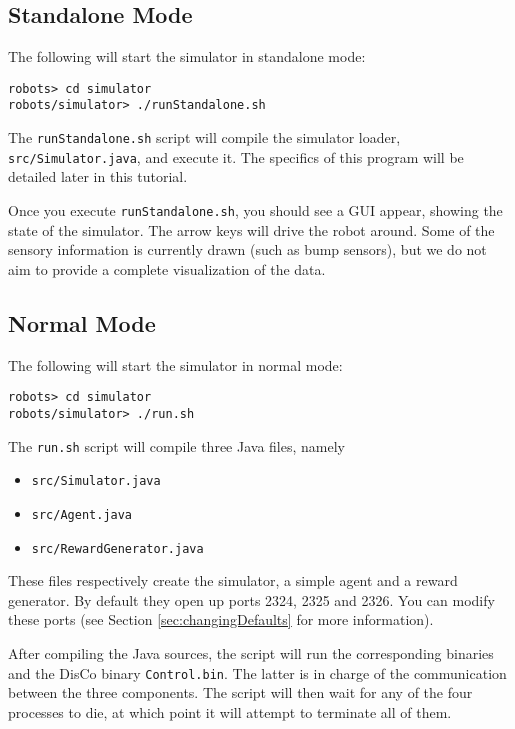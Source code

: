 \documentclass[12pt]{article}
\begin{document}
\subsection{Standalone Mode}\label{subsec:standalone}

The following will start the simulator in standalone mode:

\begin{verbatim}
robots> cd simulator 
robots/simulator> ./runStandalone.sh
\end{verbatim}

The \verb+runStandalone.sh+ script will compile the simulator loader,
\verb+src/Simulator.java+, and execute it. The specifics of this program will 
be detailed later in this tutorial.

Once you execute \verb+runStandalone.sh+, you should see a GUI appear, showing
the state of the simulator. The arrow keys will drive the robot around. Some 
of the
sensory information is currently drawn (such as bump sensors), but we do not
aim to provide a complete visualization of the data.

\subsection{Normal Mode}

The following will start the simulator in normal mode:

\begin{verbatim}
robots> cd simulator 
robots/simulator> ./run.sh
\end{verbatim}

The \verb+run.sh+ script will compile three Java files, namely

\begin{itemize}
\item{\verb+src/Simulator.java+}
\item{\verb+src/Agent.java+}
\item{\verb+src/RewardGenerator.java+}
\end{itemize}

These files respectively create the simulator, a simple agent and a reward
generator. By default they open up ports 2324, 2325 and 2326. You can modify
these ports (see Section \ref{sec:changingDefaults} for more information).

After compiling the Java sources, the script will run the corresponding
binaries and the DisCo binary \verb+Control.bin+. The latter is in charge
of the communication between the three components. The script will then wait
for any of the four processes to die, at which point it will attempt to 
terminate all of them.
\end{document}
